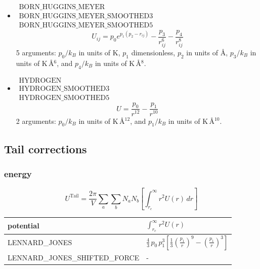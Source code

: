 \begin{itemize}
\item{$\begin{array}{l}\text{BORN\_HUGGINS\_MEYER}\\
      \text{BORN\_HUGGINS\_MEYER\_SMOOTHED3}\\
      \text{BORN\_HUGGINS\_MEYER\_SMOOTHED5}\end{array}$}\\
  \begin{equation}
    U_{ij}=p_0 e^{p_1\left(p_2-r_{ij}\right)}-\frac{p_3}{r_{ij}^6}-\frac{p_4}{r_{ij}^8}
  \end{equation}
  5 arguments: $p_0/k_B$ in units of K, $p_1$ dimensionless, $p_2$ in units of \AA, $p_3/k_B$ in units of K\,\AA$^{6}$, and
  $p_4/k_B$ in units of K\,\AA$^{8}$.

\item{$\begin{array}{l}\text{HYDROGEN}\\
      \text{HYDROGEN\_SMOOTHED3}\\
      \text{HYDROGEN\_SMOOTHED5}\end{array}$}\\
  \begin{equation}
    U= 
      \frac{p_0}{r^{12}}-\frac{p_1}{r^{10}}
  \end{equation}
   2 arguments: $p_0/k_B$ in units of K\,\AA$^{12}$, and $p_1/k_B$ in units of K\,\AA$^{10}$.

\end{itemize}

\subsection{Tail corrections}

\subsubsection*{energy}

\begin{equation}
 U^{\text{Tail}}=\frac{2 \pi}{V}\sum_a \sum_b N_a N_b \left[\int_{r_c}^\infty r^2 U\left(r\right)\, dr\right]
\end{equation}

\begin{tabular}{|l|l|}
\hline
potential & $\int_{r_c}^\infty r^2 U\left(r\right)$\\
\hline\hline
  LENNARD\_JONES &
      $\frac{4}{3}\,p_0\,p_1^3 \left[\frac{1}{3}\left(\frac{p_1}{r}\right)^{9}-\left(\frac{p_1}{r}\right)^3\right]$\\
  LENNARD\_JONES\_SHIFTED\_FORCE & -\\
\hline
\end{tabular}


